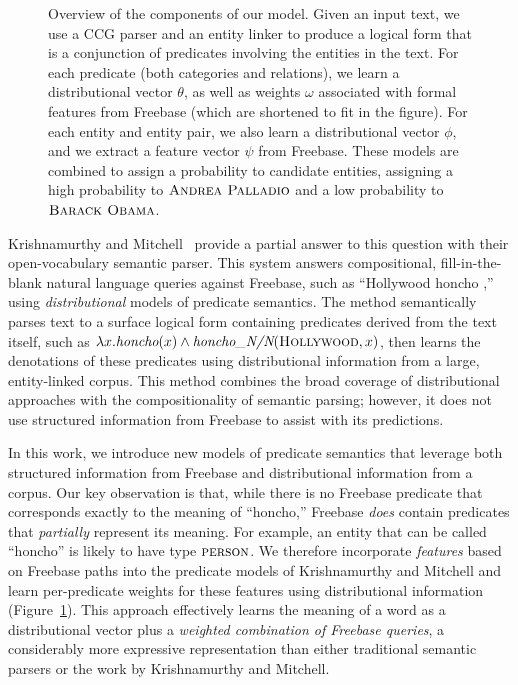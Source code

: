 \documentclass[11pt]{article}
\newcommand{\figref}[1]{Figure~\ref{fig:#1}}
\newcommand{\blank}{\underline{\hspace{.5cm}}}
\newcommand{\lexicalpredicate}[1]{\ensuremath{\textit{#1}}}
\newcommand{\formalpredicate}[1]{\ensuremath{\textsc{#1}}}
\newcommand{\entity}[1]{\ensuremath{\textsc{#1}}}
\begin{document}
\begin{figure*}[ht]
  \vspace{-.1in}
  \caption{Overview of the components of our model.  Given an input
  text, we use a CCG parser and an entity linker to produce a logical
  form that is a conjunction of predicates involving the entities in
  the text.  For each predicate (both categories and relations), we
  learn a distributional vector $\theta$, as well as weights $\omega$
  associated with formal features from Freebase (which are shortened
  to fit in the figure).  For each entity and entity pair, we also
  learn a distributional vector $\phi$, and we extract a feature
  vector $\psi$ from Freebase.  These models are combined to assign a
  probability to candidate entities, assigning a high probability to
  \entity{Andrea Palladio} and a low probability to \entity{Barack
  Obama}.}
  \label{fig:overview}
  \vspace{-.1in}
\end{figure*}

Krishnamurthy and
Mitchell~
provide a partial answer to this question with their open-vocabulary
semantic parser. This system answers compositional, fill-in-the-blank
natural language queries against Freebase, such as ``Hollywood honcho
\blank{},'' using \emph{distributional} models of predicate
semantics. The method semantically parses text to a surface logical
form containing predicates derived from the text itself, such as
$\lambda x.\lexicalpredicate{honcho}(x) \land
\lexicalpredicate{honcho\_N/N}(\entity{Hollywood}, x)$, then learns the
denotations of these predicates using distributional information from
a large, entity-linked corpus. This method combines the broad coverage
of distributional approaches with the compositionality of semantic
parsing; however, it does not use structured information from Freebase
to assist with its predictions.

In this work, we introduce new models of predicate semantics that
leverage both structured information from Freebase and distributional
information from a corpus. Our key observation is that, while there is
no Freebase predicate that corresponds exactly to the meaning of
``honcho,'' Freebase \emph{does} contain predicates that
\emph{partially} represent its meaning. For example, an entity that
can be called ``honcho'' is likely to have type
\formalpredicate{person}. We therefore incorporate \emph{features}
based on Freebase paths into the predicate models of Krishnamurthy and
Mitchell and learn per-predicate weights for these features using
distributional information (\figref{overview}). This approach
effectively learns the meaning of a word as a distributional vector
plus a \emph{weighted combination of Freebase queries}, a considerably
more expressive representation than either traditional semantic parsers
or the work by Krishnamurthy and Mitchell.
\end{document}
